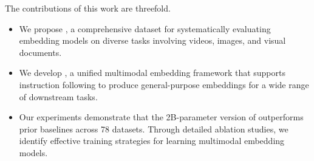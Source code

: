 The contributions of this work are threefold.
\begin{itemize}[
    itemsep=0pt,        %
    parsep=0pt,         %
    topsep=0pt,         %
    leftmargin=1em      %
]
\item We propose \benchmark, a comprehensive dataset for systematically evaluating embedding models on diverse tasks involving videos, images, and visual documents.
\item We develop \model, a unified multimodal embedding framework that supports instruction following to produce general-purpose embeddings for a wide range of downstream tasks.
\item Our experiments demonstrate that the 2B-parameter version of \model outperforms prior baselines across 78 datasets. Through detailed ablation studies, we identify effective training strategies for learning multimodal embedding models.
\end{itemize}

